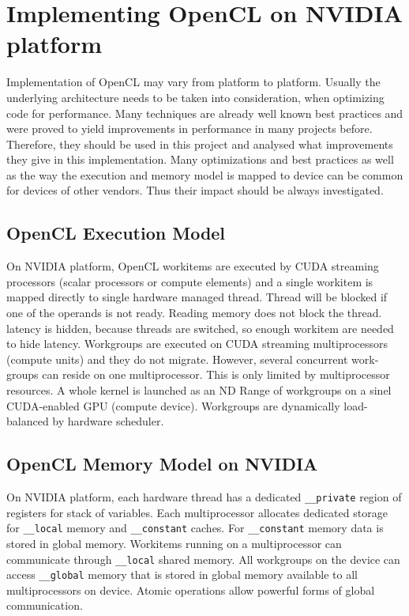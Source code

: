 \section{Implementing OpenCL on NVIDIA platform}
Implementation of OpenCL may vary from platform to platform. Usually the underlying architecture needs to be taken into consideration, when optimizing code for performance. Many techniques are already well known best practices and were proved to yield improvements in performance in many projects before. Therefore, they should be used in this project and analysed what improvements they give in this implementation. Many optimizations and best practices as well as the way the execution and memory model is mapped to device can be common for devices of other vendors. Thus their impact should be always investigated.

\subsection{OpenCL Execution Model}
On NVIDIA platform, OpenCL workitems are executed by CUDA streaming processors (scalar processors or compute elements) and a single workitem is mapped directly to single hardware managed thread. Thread will be blocked if one of the operands is not ready. Reading memory does not block the thread. latency is hidden, because threads are switched, so enough workitem are needed to hide latency. Workgroups are executed on CUDA streaming multiprocessors (compute units) and they do not migrate. However, several concurrent work-groups can reside on one multiprocessor. This is only limited by multiprocessor resources. A whole kernel is launched as an ND Range of workgroups on a sinel CUDA-enabled GPU (compute device). Workgroups are dynamically load-balanced by hardware scheduler. 

\subsection{OpenCL Memory Model on NVIDIA}
On NVIDIA platform, each hardware thread has a dedicated \texttt{\_\_private} region of registers for stack of variables. Each multiprocessor allocates dedicated storage for \texttt{\_\_local} memory and \texttt{\_\_constant} caches. For \texttt{\_\_constant} memory data is stored in global memory. Workitems running on a multiprocessor can communicate through \texttt{\_\_local} shared memory. All workgroups on the device can access \texttt{\_\_global} memory that is stored in global memory available to all multiprocessors on device. Atomic operations allow powerful forms of global communication.

